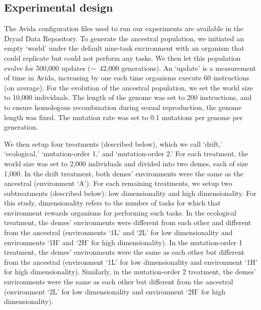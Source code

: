 \begin{doublespace}



\subsection{Experimental design}



The Avida configuration files used to run our experiments
are available in the Dryad Data Repository.
%
To generate the ancestral population,
we initiated an empty `world' under the default nine-task environment
with an organism that could replicate but could not perform any tasks.
%
We then let this population evolve
for 500,000 updates ($\sim$~42,000 generations).
%
An `update' is a measurement of time in Avida, increasing by one each time
organisms execute 60 instructions (on average).
%
For the evolution of the ancestral population,
we set the world size to 10,000 individuals.
%
The length of the genome was set to 200 instructions,
and to ensure homologous recombination
during sexual reproduction, the genome length was fixed.
%
The mutation rate was set to 0.1 mutations per genome per generation.



We then setup four treatments (described below), which we call
`drift,' `ecological,' `mu\-ta\-tion-or\-der 1,' and `mu\-ta\-tion-or\-der 2.'
%
For each treatment,
the world size was set to 2,000 individuals
and divided into two demes, each of size 1,000.
%
In the drift treatment, both demes' environments
were the same as the ancestral (environment `A').
%
For each remaining treatments,
we setup two subtreatments (described below):
low dimensionality and high dimensionality.
%
For this study, dimensionality refers to the number of tasks
for which that environment rewards organisms for performing such tasks.
%
In the ecological treatment, the demes' environments
were different from each other and different from the ancestral
(environments `1L' and `2L' for low dimensionality
and environments `1H' and `2H' for high dimensionality).
%
In the mutation-order 1 treatment,
the demes' environments were the same as each other
but different from the ancestral
(environment `1L' for low dimensionality
and environment `1H' for high dimensionality).
%
Similarly, in the mutation-order 2 treatment,
the demes' environments were the same as each other
but different from the ancestral
(environment `2L' for low dimensionality
and environment `2H' for high dimensionality).




\end{doublespace}
